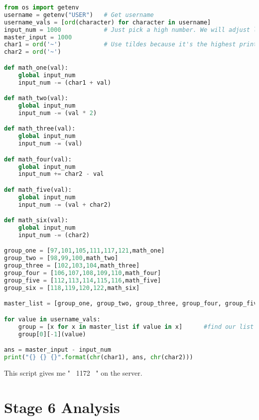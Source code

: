 \documentclass{article}
\begin{document}
\begin{lstlisting}[language=Python]
from os import getenv
username = getenv("USER")   # Get username
username_vals = [ord(character) for character in username]
input_num = 1000            # Just pick a high number. We will adjust later
master_input = 1000
char1 = ord('~')            # Use tildes because it's the highest printable ascii val (126)
char2 = ord('~')

def math_one(val):
    global input_num
    input_num -= (char1 + val)

def math_two(val):
    global input_num
    input_num -= (val * 2)

def math_three(val):
    global input_num
    input_num -= (val)

def math_four(val):
    global input_num
    input_num += char2 - val

def math_five(val):
    global input_num
    input_num -= (val + char2)

def math_six(val):
    global input_num
    input_num -= (char2)

group_one = [97,101,105,111,117,121,math_one]
group_two = [98,99,100,math_two]
group_three = [102,103,104,math_three]
group_four = [106,107,108,109,110,math_four]
group_five = [112,113,114,115,116,math_five]
group_six = [118,119,120,122,math_six]

master_list = [group_one, group_two, group_three, group_four, group_five, group_six]

for value in username_vals:
    group = [x for x in master_list if value in x]      #find our list
    group[0][-1](value)

ans = master_input - input_num
print("{} {} {}".format(chr(char1), ans, chr(char2)))
\end{lstlisting}
This script gives me "~ 1172 ~" on the server. 

\newpage
\section{Stage 6 Analysis}
\begin{flushleft}
\vspace{.5pc}
\end{flushleft}
\end{document}
